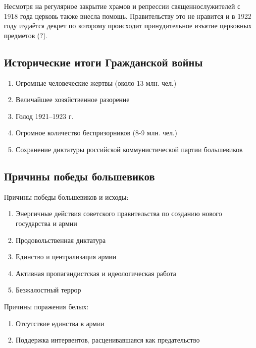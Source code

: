 Несмотря на регулярное закрытие храмов и репрессии священнослужителей с 1918 года церковь также внесла помощь. Правительству это не нравится и в 1922 году издаётся декрет по которому происходит принудительное изъятие церковных предметов (?).

\subsection{Исторические итоги Гражданской войны}

\begin{enumerate}
    \item Огромные человеческие жертвы (около 13 млн. чел.)
    \item Величайшее хозяйственное разорение
    \item Голод 1921--1923 г.
    \item Огромное количество беспризорников (8-9 млн. чел.) 
    \item Сохранение диктатуры российской коммунистической партии большевиков
\end{enumerate}

\subsection{Причины победы большевиков}

Причины победы большевиков и исходы:

\begin{enumerate}
    \item Энергичные действия советского правительства по созданию нового государства и армии
    \item Продовольственная диктатура
    \item Единство и централизация армии
    \item Активная пропагандистская и идеологическая работа
    \item Безжалостный террор
\end{enumerate}

Причины поражения белых:

\begin{enumerate}
    \item Отсутствие единства в армии
    \item Поддержка интервентов, расценивавшаяся как предательство
\end{enumerate}
